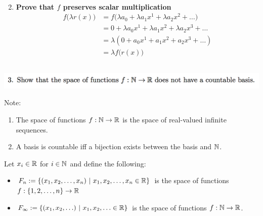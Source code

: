 \documentclass[12pt]{article}
\begin{document}
\begin{enumerate}
  \begin{align*}
  \end{align*}

\item \textbf{Prove that $f$ preserves scalar multiplication}
  \begin{align*}
    f\Big(\lambda r(x)\Big)
    &= f\Big(\lambda a_0 + \lambda a_1x^1 + \lambda a_2x^2 + \ldots \Big) \\
    &= 0 + \lambda a_0x^1 + \lambda a_1x^2 + \lambda a_2x^3 + \ldots \\
    &= \lambda(0 + a_0x^1 + a_1x^2 + a_2x^3 + \ldots) \\
    &= \lambda f\Big(r(x)\Big)
  \end{align*}


\end{enumerate}

\newpage
\subsection*{} %
\begin{mdframed}
\includegraphics[width=400pt]{img/linear-algebra-a0-1-3.png}\\
\end{mdframed}

Note:
\begin{enumerate}
\item The space of functions $f:\mathbb{N} \to \mathbb{R}$ is the space of real-valued
infinite sequences.
\item A basis is countable iff a bijection exists between the basis and $\mathbb{N}$.
\end{enumerate}


Let $x_i \in \mathbb{R}$ for
$i \in \mathbb{N}$ and define the following:
\begin{itemize}
\item $F_n := \{(x_1, x_2, \ldots, x_n) ~|~ x_1, x_2, \ldots, x_n \in \mathbb{R}\}$ is
  the space of functions\\$f:\{1,2, \ldots, n\} \to \mathbb{R}$
\item $F_\infty := \{(x_1, x_2, \ldots) ~|~ x_1, x_2, \ldots \in \mathbb{R}\}$ is the
  space of functions $f:\mathbb{N} \to \mathbb{R}$.
\end{itemize}
\end{document}
